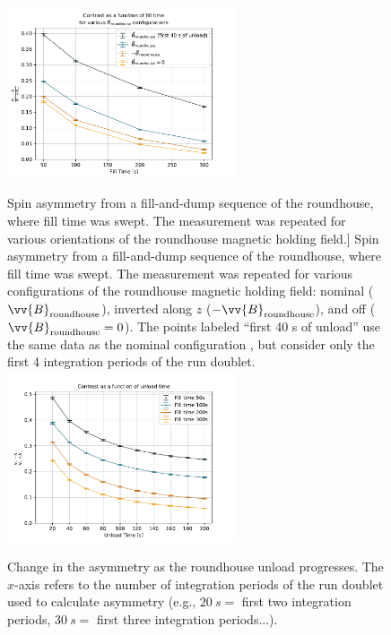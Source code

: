  \begin{figure}
    \centering
    \includegraphics[width=0.6\textwidth]{figures/2021_roundhouse_asymmetry_1.pdf}
    \caption
    [Spin asymmetry from a fill-and-dump sequence of the roundhouse, where fill time was swept. The measurement was repeated for various orientations of the roundhouse magnetic holding field.]
    {Spin asymmetry from a fill-and-dump sequence of the roundhouse, where fill time was swept. The measurement was repeated for various configurations of the roundhouse magnetic holding field: nominal ($\vv{B}_\text{roundhouse}$), inverted along $z$ ($-\vv{B}_\text{roundhouse}$), and off ($\vv{B}_\text{roundhouse}=0$). The  points labeled ``first 40 s of unload'' use the same data as the nominal configuration , but consider only the first 4 integration periods of the run doublet.}
    \label{fig:2021_roundhouse_asymmetry_1}
    \vspace{\baselineskip}
    \centering
    \includegraphics[width=0.6\textwidth]{figures/2021_roundhouse_asymmetry_2.pdf}
    \caption[Change in the asymmetry as the roundhouse unload progresses. The $x$-axis refers to the number of integration periods of the run doublet used to calculate asymmetry]
    {Change in the asymmetry as the roundhouse unload progresses. The $x$-axis refers to the number of integration periods of the run doublet used to calculate asymmetry (e.g., $\qty{20}{s}=$ first two integration periods,  $\qty{30}{s}=$ first three integration periods...).}\label{fig:2021_roundhouse_asymmetry_2}
\end{figure}